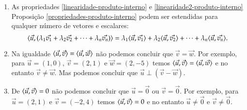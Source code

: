 \begin{observacao}
  \begin{enumerate}
    \item As propriedades \ref{linearidade-produto-interno} e \ref{linearidade2-produto-interno} Proposi\c{c}\~ao \ref{propriedades-produto-interno} podem ser estendidas para qualquer n\'umero de vetores e escalares:
    \[
      \langle\vec{u}, (\lambda_1\vec{v_1} + \lambda_2\vec{v_2} + \cdots + \lambda_n\vec{v_n} )\rangle = \lambda_1\langle \vec{u}, \vec{v_1} \rangle + \lambda_2\langle \vec{u}, \vec{v_2} \rangle + \cdots + \lambda_n\langle \vec{u}, \vec{v_n} \rangle.
    \]
    \item Na igualdade $\langle \vec{u}, \vec{v} \rangle = \langle \vec{u}, \vec{w} \rangle$ n\~ao podemos concluir que $\vec{v} = \vec{w}$. Por exemplo, para $\vec{u} = (1, 0)$, $\vec{v} = (2, 1)$ e $\vec{w} = (2, -5)$ temos $\langle \vec{u}, \vec{v} \rangle = \langle \vec{u}, \vec{w} \rangle$ e no entanto $\vec{v} \ne \vec{w}$. Mas podemos concluir que $\vec{u}\perp(\vec{v} - \vec{w})$.
    \item De $\langle \vec{u}, \vec{v} \rangle = 0$ n\~ao podemos concluir que $\vec{u} = \vec{0}$ ou $\vec{v} = \vec{0}$. Por exemplo, para $\vec{u} = (2, 1)$ e $\vec{v} = (-2, 4)$ temos $\langle \vec{u}, \vec{v} \rangle = 0$ e no entanto $\vec{u} \ne \vec{0}$ e $\vec{v} \ne \vec{0}$.
  \end{enumerate}
\end{observacao}

